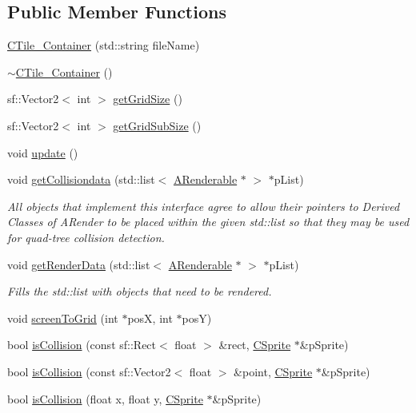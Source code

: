 \subsection*{Public Member Functions}
\begin{DoxyCompactItemize}
\item 
\hyperlink{classCTile__Container_ab3f79e82961b644d422874eb558ea312}{C\-Tile\-\_\-\-Container} (std\-::string file\-Name)
\item 
\hyperlink{classCTile__Container_ac62ffead3e87a0c405d7bd6f25581927}{$\sim$\-C\-Tile\-\_\-\-Container} ()
\item 
sf\-::\-Vector2$<$ int $>$ \hyperlink{classCTile__Container_ae8a4d2b6e49fbec47d92cbb19bb9d3c7}{get\-Grid\-Size} ()
\item 
sf\-::\-Vector2$<$ int $>$ \hyperlink{classCTile__Container_a876984278369d0cafc24890959128ed0}{get\-Grid\-Sub\-Size} ()
\item 
void \hyperlink{classCTile__Container_abe6e19de544f042671094697bb83fde9}{update} ()
\item 
void \hyperlink{classCTile__Container_ae61b573ed7b47bea750040a26b492632}{get\-Collisiondata} (std\-::list$<$ \hyperlink{classARenderable}{A\-Renderable} $\ast$ $>$ $\ast$p\-List)
\begin{DoxyCompactList}\small\item\em All objects that implement this interface agree to allow their pointers to Derived Classes of A\-Render to be placed within the given std\-::list so that they may be used for quad-\/tree collision detection. \end{DoxyCompactList}\item 
void \hyperlink{classCTile__Container_a48c74611efadee522595362a79620bff}{get\-Render\-Data} (std\-::list$<$ \hyperlink{classARenderable}{A\-Renderable} $\ast$ $>$ $\ast$p\-List)
\begin{DoxyCompactList}\small\item\em Fills the std\-::list with objects that need to be rendered. \end{DoxyCompactList}\item 
void \hyperlink{classCTile__Container_a14f90644c3a992813a629cea3e81aa38}{screen\-To\-Grid} (int $\ast$pos\-X, int $\ast$pos\-Y)
\item 
bool \hyperlink{classCTile__Container_adfda15836508531632c4ca506caf6360}{is\-Collision} (const sf\-::\-Rect$<$ float $>$ \&rect, \hyperlink{classCSprite}{C\-Sprite} $\ast$\&p\-Sprite)
\item 
bool \hyperlink{classCTile__Container_a4195d75fcc4790946b19ea82fc693a1c}{is\-Collision} (const sf\-::\-Vector2$<$ float $>$ \&point, \hyperlink{classCSprite}{C\-Sprite} $\ast$\&p\-Sprite)
\item 
bool \hyperlink{classCTile__Container_a3c8b4ccbb9afaaa9462a11962b6e2dbd}{is\-Collision} (float x, float y, \hyperlink{classCSprite}{C\-Sprite} $\ast$\&p\-Sprite)
\end{DoxyCompactItemize}


